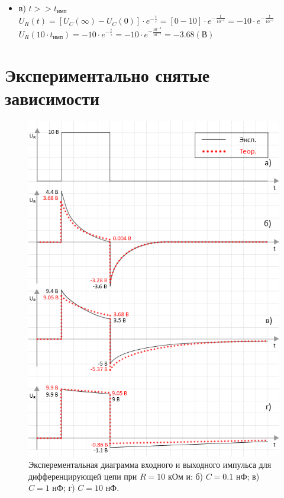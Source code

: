 \begin{itemize}
\begin{itemize}
\item[] в) $t >> t_\text{имп}$\\

		$U_R(t) = [U_C(\infty) - U_C(0)] \cdot e^{-\frac{t}{\tau}} = [0 - 10] \cdot e^{-\frac{t}{10^{-4}}} = -10 \cdot e^{-\frac{t}{10^{-4}}}$\\

		$U_R(10 \cdot t_\text{имп}) = -10 \cdot e^{-\frac{t}{\tau}} = -10 \cdot e^{-\frac{10^{-4}}{10^{-4}}} = -3.68 (\text{В})$\\

\end{itemize}
\end{itemize}

\section{Экспериментально снятые зависимости}

\begin{figure}[H]
	\begin{center}
		\includegraphics[width=14cm]{img/diff_with_theory}
		\caption{Эксперементальная диаграмма входного и выходного импульса для дифференцирующей цепи при $R = 10$ кОм и: б) $C = 0.1$ нФ; в) $C = 1$ нФ; г) $C = 10$ нФ.} 
		\label{t:1} %
	\end{center}
\end{figure}

